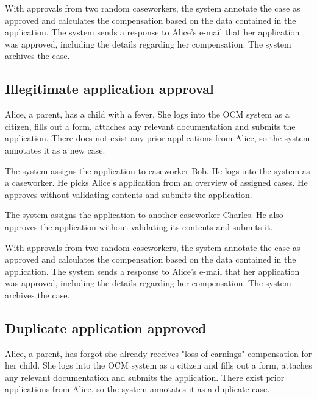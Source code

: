 \documentclass{article}
\begin{document}
\vspace{2mm}

With approvals from two random caseworkers, the system annotate the case as approved and calculates the compensation based on the data contained in the application. The system sends a response to Alice's e-mail that her application was approved, including the details regarding her compensation. The system archives the case.

\subsection*{Illegitimate application approval}

Alice, a parent, has a child with a fever. She logs into the OCM system as a citizen, fills out a form, attaches any relevant documentation and submits the application. There does not exist any prior applications from Alice, so the system annotates it as a new case.

\vspace{2mm}

The system assigns the application to caseworker Bob. He logs into the system as a caseworker. He picks Alice's application from an overview of assigned cases. He approves without validating contents and submits the application.

\vspace{2mm}

The system assigns the application to another caseworker Charles. He also approves the application without validating its contents and submits it.

\vspace{2mm}

With approvals from two random caseworkers, the system annotate the case as approved and calculates the compensation based on the data contained in the application. The system sends a response to Alice's e-mail that her application was approved, including the details regarding her compensation. The system archives the case.

\subsection*{Duplicate application approved}

Alice, a parent, has forgot she already receives "loss of earnings" compensation for her child. She logs into the OCM system as a citizen and fills out a form, attaches any relevant documentation and submits the application. There exist prior applications from Alice, so the system annotates it as a duplicate case.
\end{document}
